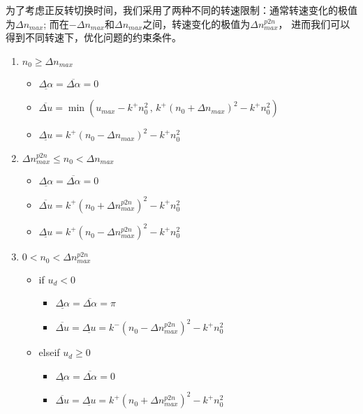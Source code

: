 为了考虑正反转切换时间，我们采用了两种不同的转速限制：通常转速变化的极值为$\Delta n_{max}$;
而在$-\Delta n_{max}$和$\Delta n_{max}$之间，转速变化的极值为$\Delta n_{max}^{p2n} $，
进而我们可以得到不同转速下，优化问题的约束条件。

\begin{enumerate}
  \item $n_0 \geq \Delta n_{max}$
  \begin{itemize}
    \item $\underline{\Delta \alpha} = \overline{\Delta \alpha} = 0$
    \item $\overline{\Delta u}= \min \left( u_{max}-k^+ n_0^2 \, , \,
    k^+ (n_0+ \Delta n_{max})^2 - k^+ n_0^2 \right)$
    \item $\underline{\Delta u}=k^+ (n_0 - \Delta n_{max})^2 - k^+ n_0^2 $
  \end{itemize}

  \item $\Delta n_{max}^{p2n} \leq n_0 < \Delta n_{max}$
  \begin{itemize}
    \item $\underline{\Delta \alpha} = \overline{\Delta \alpha} = 0$
    \item $\overline{\Delta u}= k^+ (n_0 + \Delta n_{max}^{p2n})^2 - k^+ n_0^2$
    \item $\underline{\Delta u}=k^+ (n_0 - \Delta n_{max}^{p2n})^2 - k^+ n_0^2 $
  \end{itemize}

  \item $0 < n_0 < \Delta n_{max}^{p2n}$
  \begin{itemize}
    \item if $u_d < 0$
    \begin{itemize}
      \item $\underline{\Delta \alpha} = \overline{\Delta \alpha} = \pi$
      \item $\overline{\Delta u}= \underline{\Delta u}=
      k^- (n_0 - \Delta n_{max}^{p2n})^2 - k^+ n_0^2$
    \end{itemize}
    \item elseif $u_d \geq 0$
    \begin{itemize}
      \item $\underline{\Delta \alpha} = \overline{\Delta \alpha} = 0$
      \item $\overline{\Delta u}= \underline{\Delta u}=
      k^+ (n_0 + \Delta n_{max}^{p2n})^2 - k^+ n_0^2$
    \end{itemize}
  \end{itemize}


\end{enumerate}
